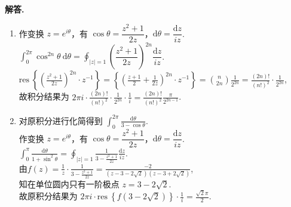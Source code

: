 \documentclass[11pt]{ctexart}
\newenvironment{solution}{\par\noindent\textbf{解答. }}{\par}
\begin{document}
\begin{solution}
    \begin{enumerate}[(1)]
        \item 作变换 $z = e^{i\theta}$，有 $\cos{\theta} = \dfrac{z^2+1}{2z}$，$\text{d}\theta = \dfrac{\text{d}z}{iz}$.\\[12pt]
              $\displaystyle\int_{0}^{2\pi}\cos^{2n}{\theta}\ \text{d}\theta
              = \oint_{\left|z\right|=1}\left(\dfrac{z^2+1}{2z}\right)^{2n}\dfrac{\text{d}z}{iz}$.\\[12pt]
              $\displaystyle\text{res}\ \left\{\left(\frac{z^2+1}{2z}\right)^{2n}\cdot z^{-1}\right\}
              = \left\{\left(\frac{z+1}{2}+\frac{1}{2z}\right)^{2n}\cdot z^{-1}\right\}
              = \binom{n}{2n}\frac{1}{2^{2n}}
              = \frac{(2n)!}{\left(n!\right)^2}\cdot\frac{1}{2^{2n}}$,\\[12pt]
              故积分结果为 $\displaystyle2\pi i\cdot\frac{(2n)!}{\left(n!\right)^2}\cdot\frac{1}{2^{2n}}\cdot\frac{1}{i}
              = \frac{(2n)!}{(n!)^2}\frac{\pi}{2^{2n-1}}$.
        \item 对原积分进行化简得到 $\displaystyle\int_{0}^{2\pi}\frac{\text{d}\theta}{3-\cos{\theta}}$.\\[12pt]
              作变换 $z = e^{i\theta}$，有 $\cos{\theta} = \dfrac{z^2+1}{2z}$，$\text{d}\theta = \dfrac{\text{d}z}{iz}$.\\[12pt]
              $\displaystyle\int_{0}^{\pi}\frac{\text{d}\theta}{1+\sin^2{\theta}}
              = \oint_{\left|z\right|=1}\frac{1}{3-\frac{z^2+1}{2z}}\frac{\text{d}z}{iz}$.\\[12pt]
              由$\displaystyle f(z) = \frac{1}{z}\cdot\frac{1}{3-\frac{z^2+1}{2z}}
              = \frac{-2}{(z-3-2\sqrt{2})(z-3+2\sqrt{2})}$,\\[12pt]
              知在单位圆内只有一阶极点 $z = 3 - 2\sqrt{2}$.\\[12pt]
              故原积分结果为 $\displaystyle2\pi i\cdot\text{res}\ \left\{f(3 - 2\sqrt{2})\right\}\cdot\frac{1}{i}
              = \frac{\sqrt{2}\pi}{2}$.
    \end{enumerate}
\end{solution}
\end{document}
